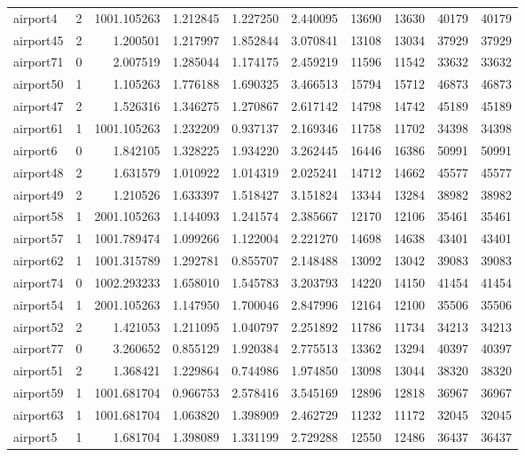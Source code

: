 \begin{longtable}{|l|r|r|r|r|r|r|r|r|r|}
airport4 & 2 & 1001.105263 & 1.212845 & 1.227250 & 2.440095 & 13690 & 13630 & 40179 & 40179 \\
airport45 & 2 & 1.200501 & 1.217997 & 1.852844 & 3.070841 & 13108 & 13034 & 37929 & 37929 \\
airport71 & 0 & 2.007519 & 1.285044 & 1.174175 & 2.459219 & 11596 & 11542 & 33632 & 33632 \\
airport50 & 1 & 1.105263 & 1.776188 & 1.690325 & 3.466513 & 15794 & 15712 & 46873 & 46873 \\
airport47 & 2 & 1.526316 & 1.346275 & 1.270867 & 2.617142 & 14798 & 14742 & 45189 & 45189 \\
airport61 & 1 & 1001.105263 & 1.232209 & 0.937137 & 2.169346 & 11758 & 11702 & 34398 & 34398 \\
airport6 & 0 & 1.842105 & 1.328225 & 1.934220 & 3.262445 & 16446 & 16386 & 50991 & 50991 \\
airport48 & 2 & 1.631579 & 1.010922 & 1.014319 & 2.025241 & 14712 & 14662 & 45577 & 45577 \\
airport49 & 2 & 1.210526 & 1.633397 & 1.518427 & 3.151824 & 13344 & 13284 & 38982 & 38982 \\
airport58 & 1 & 2001.105263 & 1.144093 & 1.241574 & 2.385667 & 12170 & 12106 & 35461 & 35461 \\
airport57 & 1 & 1001.789474 & 1.099266 & 1.122004 & 2.221270 & 14698 & 14638 & 43401 & 43401 \\
airport62 & 1 & 1001.315789 & 1.292781 & 0.855707 & 2.148488 & 13092 & 13042 & 39083 & 39083 \\
airport74 & 0 & 1002.293233 & 1.658010 & 1.545783 & 3.203793 & 14220 & 14150 & 41454 & 41454 \\
airport54 & 1 & 2001.105263 & 1.147950 & 1.700046 & 2.847996 & 12164 & 12100 & 35506 & 35506 \\
airport52 & 2 & 1.421053 & 1.211095 & 1.040797 & 2.251892 & 11786 & 11734 & 34213 & 34213 \\
airport77 & 0 & 3.260652 & 0.855129 & 1.920384 & 2.775513 & 13362 & 13294 & 40397 & 40397 \\
airport51 & 2 & 1.368421 & 1.229864 & 0.744986 & 1.974850 & 13098 & 13044 & 38320 & 38320 \\
airport59 & 1 & 1001.681704 & 0.966753 & 2.578416 & 3.545169 & 12896 & 12818 & 36967 & 36967 \\
airport63 & 1 & 1001.681704 & 1.063820 & 1.398909 & 2.462729 & 11232 & 11172 & 32045 & 32045 \\
airport5 & 1 & 1.681704 & 1.398089 & 1.331199 & 2.729288 & 12550 & 12486 & 36437 & 36437 \\

\end{longtable}
